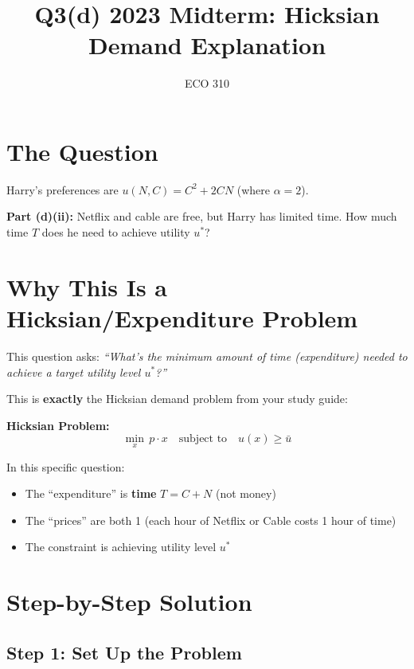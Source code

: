 \documentclass[11pt]{article}
\title{Q3(d) 2023 Midterm: Hicksian Demand Explanation}
\author{ECO 310}
\date{}
\begin{document}
\maketitle

\section{The Question}

Harry's preferences are $u(N, C) = C^2 + 2CN$ (where $\alpha = 2$).

\textbf{Part (d)(ii):} Netflix and cable are free, but Harry has limited time. How much time $T$ does he need to achieve utility $u^*$?

\section{Why This Is a Hicksian/Expenditure Problem}

This question asks: \textit{``What's the minimum amount of time (expenditure) needed to achieve a target utility level $u^*$?''}

This is \textbf{exactly} the Hicksian demand problem from your study guide:

\begin{center}
\colorbox{yellow!30}{
\begin{minipage}{0.9\textwidth}
\textbf{Hicksian Problem:}
\[
\min_{x} \, p \cdot x \quad \text{subject to} \quad u(x) \geq \bar{u}
\]
\end{minipage}
}
\end{center}

In this specific question:
\begin{itemize}
    \item The ``expenditure'' is \textbf{time} $T = C + N$ (not money)
    \item The ``prices'' are both 1 (each hour of Netflix or Cable costs 1 hour of time)
    \item The constraint is achieving utility level $u^*$
\end{itemize}

\section{Step-by-Step Solution}

\subsection{Step 1: Set Up the Problem}
\end{document}
